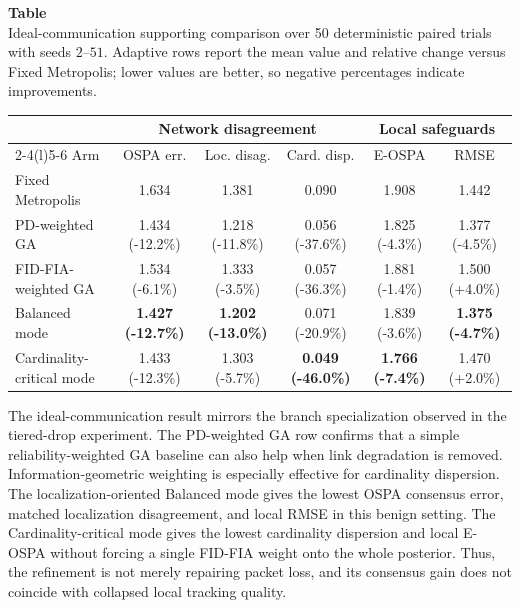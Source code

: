 \label{tab:ideal-support}
\noindent\textbf{Table~\thetable}\\
\noindent Ideal-communication supporting comparison over 50 deterministic paired trials with seeds $2$--$51$. Adaptive rows report the mean value and relative change versus Fixed Metropolis; lower values are better, so negative percentages indicate improvements.
\begin{center}
  \scriptsize
  \setlength{\tabcolsep}{3pt}
  \begin{tabular*}{\linewidth}{@{\extracolsep{\fill}}lccccc@{}}
    \toprule
    & \multicolumn{3}{c}{Network disagreement} & \multicolumn{2}{c}{Local safeguards} \\
    \cmidrule(lr){2-4}\cmidrule(l){5-6}
    Arm & OSPA err. & Loc. disag. & Card. disp. & E-OSPA & RMSE \\
    \midrule
    Fixed Metropolis & 1.634 & 1.381 & 0.090 & 1.908 & 1.442 \\
    PD-weighted GA & 1.434 (-12.2\%) & 1.218 (-11.8\%) & 0.056 (-37.6\%) & 1.825 (-4.3\%) & 1.377 (-4.5\%) \\
    FID-FIA-weighted GA & 1.534 (-6.1\%) & 1.333 (-3.5\%) & 0.057 (-36.3\%) & 1.881 (-1.4\%) & 1.500 (+4.0\%) \\
    Balanced mode & \textbf{1.427 (-12.7\%)} & \textbf{1.202 (-13.0\%)} & 0.071 (-20.9\%) & 1.839 (-3.6\%) & \textbf{1.375 (-4.7\%)} \\
    Cardinality-critical mode & 1.433 (-12.3\%) & 1.303 (-5.7\%) & \textbf{0.049 (-46.0\%)} & \textbf{1.766 (-7.4\%)} & 1.470 (+2.0\%) \\
    \bottomrule
  \end{tabular*}
\end{center}

The ideal-communication result mirrors the branch specialization observed in the tiered-drop experiment. The PD-weighted GA row confirms that a simple reliability-weighted GA baseline can also help when link degradation is removed. Information-geometric weighting is especially effective for cardinality dispersion. The localization-oriented Balanced mode gives the lowest OSPA consensus error, matched localization disagreement, and local RMSE in this benign setting. The Cardinality-critical mode gives the lowest cardinality dispersion and local E-OSPA without forcing a single FID-FIA weight onto the whole posterior. Thus, the refinement is not merely repairing packet loss, and its consensus gain does not coincide with collapsed local tracking quality.

